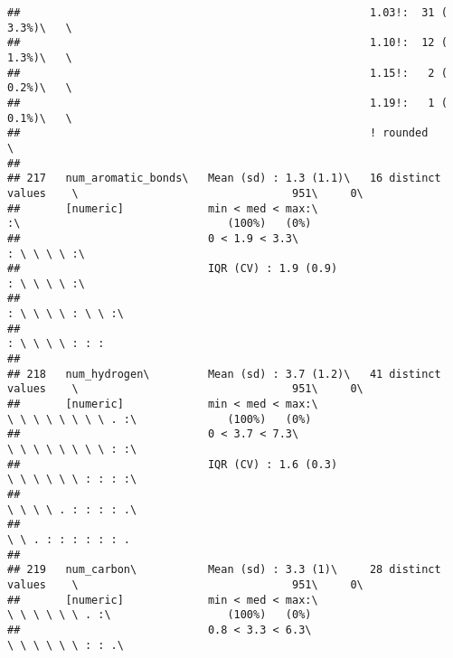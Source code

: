 \documentclass[]{article}
\begin{document}
\begin{verbatim}
##                                                      1.03!:  31 ( 3.3%)\   \                                                   
##                                                      1.10!:  12 ( 1.3%)\   \                                                   
##                                                      1.15!:   2 ( 0.2%)\   \                                                   
##                                                      1.19!:   1 ( 0.1%)\   \                                                   
##                                                      ! rounded             \                                                   
## 
## 217   num_aromatic_bonds\   Mean (sd) : 1.3 (1.1)\   16 distinct values    \                                 951\     0\       
##       [numeric]             min < med < max:\                              :\                                (100%)   (0%)     
##                             0 < 1.9 < 3.3\                                 : \ \ \ \ :\                                        
##                             IQR (CV) : 1.9 (0.9)                           : \ \ \ \ :\                                        
##                                                                            : \ \ \ \ : \ \ :\                                  
##                                                                            : \ \ \ \ : : :                                     
## 
## 218   num_hydrogen\         Mean (sd) : 3.7 (1.2)\   41 distinct values    \                                 951\     0\       
##       [numeric]             min < med < max:\                              \ \ \ \ \ \ \ \ . :\              (100%)   (0%)     
##                             0 < 3.7 < 7.3\                                 \ \ \ \ \ \ \ \ : :\                                
##                             IQR (CV) : 1.6 (0.3)                           \ \ \ \ \ \ : : : :\                                
##                                                                            \ \ \ \ . : : : : .\                                
##                                                                            \ \ . : : : : : : .                                 
## 
## 219   num_carbon\           Mean (sd) : 3.3 (1)\     28 distinct values    \                                 951\     0\       
##       [numeric]             min < med < max:\                              \ \ \ \ \ \ . :\                  (100%)   (0%)     
##                             0.8 < 3.3 < 6.3\                               \ \ \ \ \ \ : : .\                                  

\end{verbatim}
\end{document}

